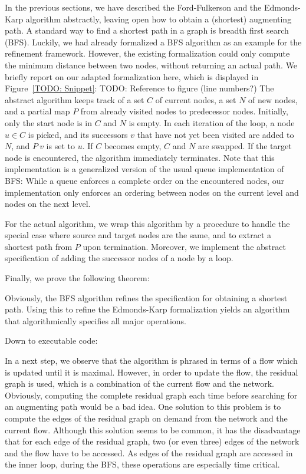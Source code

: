\documentclass{llncs}
\begin{document}
  In the previous sections, we have described the Ford-Fulkerson and the Edmonds-Karp algorithm abstractly,  
  leaving open how to obtain a (shortest) augmenting path. A standard way to find a shortest path in a graph 
  is breadth first search (BFS). Luckily, we had already formalized a BFS algorithm as an example for the refinement framework.
  However, the existing formalization could only compute the minimum distance between two nodes, without returning an actual path.
  We briefly report on our adapted formalization here, which is displayed in Figure~\ref{TODO: Snippet}: 
  TODO: Reference to figure (line numbers?)
  The abstract algorithm keeps track of a set $C$ of current nodes, a set $N$ of new nodes, and a partial map $P$ from already visited nodes to predecessor nodes.
  Initially, only the start node is in $C$ and $N$ is empty. In each iteration of the loop, a node $u\in C$ is picked, and its successors $v$ that have not yet been 
  visited are added to $N$, and $P~v$ is set to $u$. If $C$ becomes empty, $C$ and $N$ are swapped. If the target node is encountered, the algorithm immediately terminates.
  Note that this implementation is a generalized version of the usual queue implementation of BFS: While a queue enforces a complete order on the encountered nodes, our 
  implementation only enforces an ordering between nodes on the current level and nodes on the next level. 

  For the actual algorithm, we wrap this algorithm by a procedure to handle the special case where source and target nodes are the same, and to extract a shortest path 
  from $P$ upon termination. Moreover, we implement the abstract specification of adding the successor nodes of a node by a loop.
  
  Finally, we prove the following theorem: %
  
  Obviously, the BFS algorithm refines the specification for obtaining a shortest path.
  Using this to refine the Edmonds-Karp formalization yields an algorithm that algorithmically specifies all major operations.
    
  Down to executable code:
    
  In a next step, we observe that the algorithm is phrased in terms of a flow which is updated until it is maximal. However,
  in order to update the flow, the residual graph is used, which is a combination of the current flow and the network.
  Obviously, computing the complete residual graph each time before searching for an augmenting path would be a bad idea. 
  One solution to this problem is to compute the edges of the residual graph on demand from the network and the current flow.
  Although this solution seems to be common, it has the disadvantage that for each edge of the residual graph, two (or even three) 
  edges of the network and the flow have to be accessed. As edges of the residual graph are accessed in the inner loop, during 
  the BFS, these operations are especially time critical.
  
\end{document}
